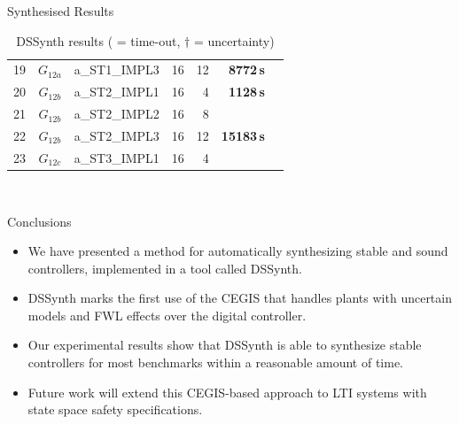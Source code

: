 \documentclass{beamer}
\newcommand\tool{{\sf DSSynth}\xspace}
\newcommand{\xmark}{\ding{55}}
\begin{document}
\begin{frame}[fragile]{Synthesised Results}
\begin{table}
{\begin{tabular}{| r | c | l | r r || r | r |}
19 &$G_{12a}$& a\_ST1\_IMPL3
            &  16 &  12 & \textbf{8772\,s}   & \xmark   \\
20 &$G_{12b}$& a\_ST2\_IMPL1
            &  16 &   4 & \textbf{1128\,s}  & \xmark   \\
21 &$G_{12b}$& a\_ST2\_IMPL2
            &  16 &   8 & \xmark  & \xmark    \\
22 &$G_{12b}$& a\_ST2\_IMPL3
            &  16 &  12 & \textbf{15183\,s} & \xmark   \\ 
23 &$G_{12c}$& a\_ST3\_IMPL1
            &  16 &   4 & \xmark & \xmark   \\\hline
\end{tabular}}\\[0.2ex]
\caption{\tool results ({\xmark} = time-out, $\dagger$ = 
uncertainty)
\label{tab:results}}
\end{table}
\end{frame} 

\begin{frame}{Conclusions}
\begin{itemize}
\item We have presented a method for automatically synthesizing stable and sound controllers, implemented
in a tool called \tool.
\item \tool marks the first use of the
CEGIS that handles plants with uncertain models and FWL effects over the
digital controller.  
\item Our experimental results show that \tool is able to synthesize
stable controllers for most benchmarks within a reasonable amount of time.  
\item Future work will extend this CEGIS-based
approach to LTI systems with state space safety specifications. 
\end{itemize}
\end{frame}
\end{document}
